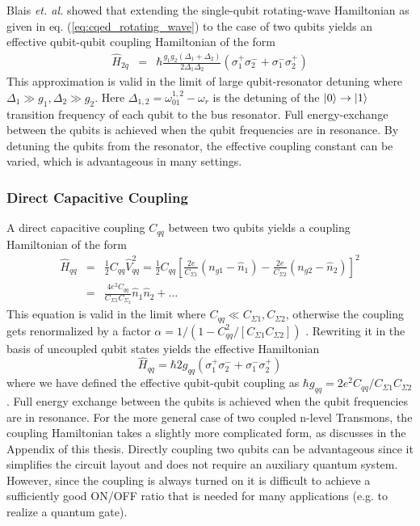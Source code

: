 Blais {\it et. al.} \citep{blais_quantum-information_2007} showed that extending the single-qubit rotating-wave Hamiltonian as given in eq. (\ref{eq:cqed_rotating_wave}) to the case of two qubits yields an effective qubit-qubit coupling Hamiltonian of the form
%
\begin{eqnarray}
\hat{H}_{2q} & = & \hbar\frac{g_1 g_2(\Delta_1+\Delta_2)}{2\Delta_1\Delta_2}(\sigma_1^+\sigma_2^-+\sigma_1^-\sigma_2^+) \label{eq:cqed_bus_coupling}
\end{eqnarray}
%
This approximation is valid in the limit of large qubit-resonator detuning where $\Delta_1 \gg g_1,\Delta_2 \gg g_2$. Here $\Delta_{1,2} = \omega_{01}^{1,2}-\omega_r$ is the detuning of the $\left| 0 \right>\to\left| 1 \right>$ transition frequency of each qubit to the bus resonator. Full energy-exchange between the qubits is achieved when the qubit frequencies are in resonance. By detuning the qubits from the resonator, the effective coupling constant can be varied, which is advantageous in many settings. 

\subsubsection{Direct Capacitive Coupling}

A direct capacitive coupling $C_{qq}$ between two qubits yields a coupling Hamiltonian of the form
%
\begin{eqnarray}
\hat{H}_{qq} & = & \frac{1}{2}C_{qq}\hat{V}_{qq}^2 = \frac{1}{2}C_{qq}\left[\frac{2e}{C_{\Sigma 1}}(n_{g1}-\hat{n}_1)-\frac{2e}{C_{\Sigma 2}}(n_{g2}-\hat{n}_2)\right]^2 \\
& = & \frac{4e^2 C_{qq}}{C_{\Sigma 1}C_{\Sigma_2}}\hat{n}_1\hat{n}_2+\hdots \label{eq:cqed_capacitive_coupling}
\end{eqnarray}
%
This equation is valid in the limit where $C_{qq} \ll C_{\Sigma 1},C_{\Sigma 2}$, otherwise the coupling gets renormalized by a factor $\alpha = 1/(1-C_{qq}^2/[C_{\Sigma 1}C_{\Sigma 2}])$ \citep{nguyen_cooper_2008}. Rewriting it in the basis of uncoupled qubit states yields the effective Hamiltonian
%
\begin{equation}
\hat{H}_{qq} = \hbar 2 g_{qq}\left(\sigma^+_1\sigma^-_2+\sigma^-_1\sigma^+_2\right) \label{eq:cqed_qubit_interaction_hamiltonian}
\end{equation}
%
where we have defined the effective qubit-qubit coupling as $\hbar g_{qq} = 2e^2 C_{qq}/C_{\Sigma 1}C_{\Sigma 2}$. Full energy exchange between the qubits is achieved when the qubit frequencies are in resonance. For the more general case of two coupled n-level Transmons, the coupling Hamiltonian takes a slightly more complicated form, as discusses in the Appendix of this thesis. Directly coupling two qubits can be advantageous since it simplifies the circuit layout and does not require an auxiliary quantum system. However, since the coupling is always turned on it is difficult to achieve a sufficiently good ON/OFF ratio that is needed for many applications (e.g. to realize a quantum gate).

